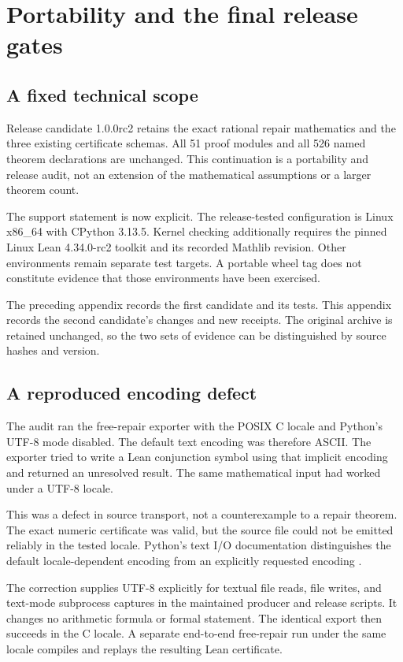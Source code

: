 \chapter{Portability and the final release gates}
\label{app:rc2-portability}

\section{A fixed technical scope}

Release candidate 1.0.0rc2 retains the exact rational repair mathematics and the three existing certificate schemas. All 51 proof modules and all 526 named theorem declarations are unchanged. This continuation is a portability and release audit, not an extension of the mathematical assumptions or a larger theorem count.

The support statement is now explicit. The release-tested configuration is Linux x86\_64 with CPython 3.13.5. Kernel checking additionally requires the pinned Linux Lean 4.34.0-rc2 toolkit and its recorded Mathlib revision. Other environments remain separate test targets. A portable wheel tag does not constitute evidence that those environments have been exercised.

The preceding appendix records the first candidate and its tests. This appendix records the second candidate's changes and new receipts. The original archive is retained unchanged, so the two sets of evidence can be distinguished by source hashes and version.

\section{A reproduced encoding defect}

The audit ran the free-repair exporter with the POSIX C locale and Python's UTF-8 mode disabled. The default text encoding was therefore ASCII. The exporter tried to write a Lean conjunction symbol using that implicit encoding and returned an unresolved result. The same mathematical input had worked under a UTF-8 locale.

This was a defect in source transport, not a counterexample to a repair theorem. The exact numeric certificate was valid, but the source file could not be emitted reliably in the tested locale. Python's text I/O documentation distinguishes the default locale-dependent encoding from an explicitly requested encoding \cite{pythonio}.

The correction supplies UTF-8 explicitly for textual file reads, file writes, and text-mode subprocess captures in the maintained producer and release scripts. It changes no arithmetic formula or formal statement. The identical export then succeeds in the C locale. A separate end-to-end free-repair run under the same locale compiles and replays the resulting Lean certificate.

